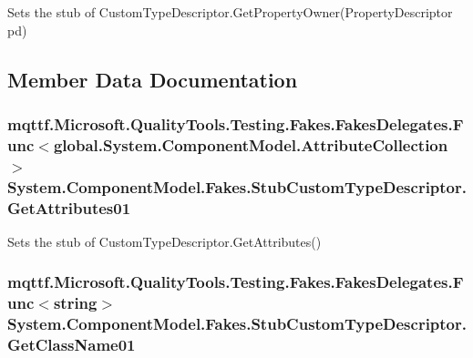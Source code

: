 Sets the stub of Custom\-Type\-Descriptor.\-Get\-Property\-Owner(\-Property\-Descriptor pd)



\subsection{Member Data Documentation}
\hypertarget{class_system_1_1_component_model_1_1_fakes_1_1_stub_custom_type_descriptor_acab6c28b14b8d81fc27ec14fa7fefae7}{
\subsubsection[{Get\-Attributes01}]{\setlength{\rightskip}{0pt plus 5cm}mqttf.\-Microsoft.\-Quality\-Tools.\-Testing.\-Fakes.\-Fakes\-Delegates.\-Func$<$global.\-System.\-Component\-Model.\-Attribute\-Collection$>$ System.\-Component\-Model.\-Fakes.\-Stub\-Custom\-Type\-Descriptor.\-Get\-Attributes01}}\label{class_system_1_1_component_model_1_1_fakes_1_1_stub_custom_type_descriptor_acab6c28b14b8d81fc27ec14fa7fefae7}


Sets the stub of Custom\-Type\-Descriptor.\-Get\-Attributes()

\hypertarget{class_system_1_1_component_model_1_1_fakes_1_1_stub_custom_type_descriptor_a1048a28d7fadbd3aeb351297a4f4a4cb}{
\subsubsection[{Get\-Class\-Name01}]{\setlength{\rightskip}{0pt plus 5cm}mqttf.\-Microsoft.\-Quality\-Tools.\-Testing.\-Fakes.\-Fakes\-Delegates.\-Func$<$string$>$ System.\-Component\-Model.\-Fakes.\-Stub\-Custom\-Type\-Descriptor.\-Get\-Class\-Name01}}\label{class_system_1_1_component_model_1_1_fakes_1_1_stub_custom_type_descriptor_a1048a28d7fadbd3aeb351297a4f4a4cb}


